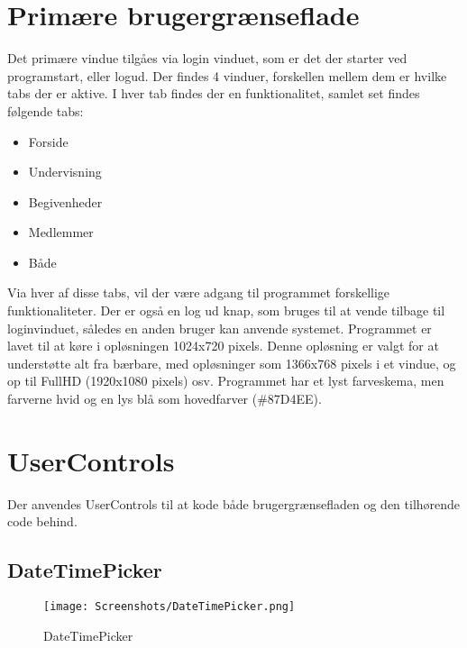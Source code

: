 \section{Primære brugergrænseflade}
Det primære vindue tilgåes via login vinduet, som er det der starter ved programstart, eller logud. 
Der findes 4 vinduer, forskellen mellem dem er hvilke tabs der er aktive. 
I hver tab findes der en funktionalitet, samlet set findes følgende tabs:
\begin{itemize}%
    \item Forside
    \item Undervisning
    \item Begivenheder
    \item Medlemmer
    \item Både
\end{itemize}

Via hver af disse tabs, vil der være adgang til programmet forskellige funktionaliteter.
Der er også en log ud knap, som bruges til at vende tilbage til loginvinduet, således en anden bruger kan anvende systemet.
Programmet er lavet til at køre i opløsningen 1024x720 pixels.
Denne opløsning er valgt for at understøtte alt fra bærbare, med opløsninger som 1366x768 pixels i et vindue, og op til FullHD (1920x1080 pixels) osv.
Programmet har et lyst farveskema, men farverne hvid og en lys blå som hovedfarver (\#87D4EE).

\section{UserControls}
Der anvendes UserControls til at kode både brugergrænsefladen og den tilhørende code behind.


\subsection{DateTimePicker}\label{subsec:DateTimePicker}

\begin{wrapfigure}{r}{0.5\textwidth}
    \label{img:DateTimePicker}
    \vspace{-20pt}
    \begin{center}
        \texttt{[image: Screenshots/DateTimePicker.png]}
    \end{center}
    \vspace{-15pt}
    \caption{DateTimePicker}
    \vspace{-30pt}
\end{wrapfigure}


